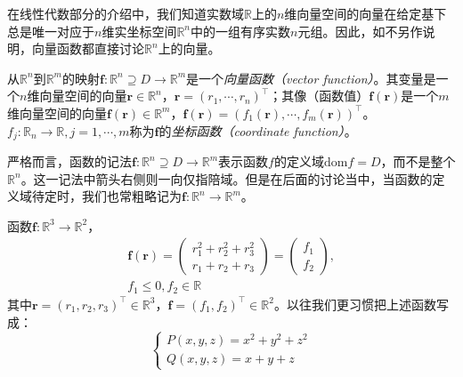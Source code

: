 \documentclass[main.tex]{subfiles}
\begin{document}
在线性代数部分的介绍中，我们知道实数域$\mathbb{R}$上的$n$维向量空间的向量在给定基下总是唯一对应于$n$维实坐标空间$\mathbb{R}^n$中的一组有序实数$n$元组。因此，如不另作说明，向量函数都直接讨论$\mathbb{R}^n$上的向量。

\begin{definition}[向量函数]\label{def:II.4.1}
    从$\mathbb{R}^n$到$\mathbb{R}^m$的映射$\mathbf{f}:\mathbb{R}^n\supseteq D\rightarrow\mathbb{R}^m$是一个\emph{向量函数（vector function）}。其变量是一个$n$维向量空间的向量$\mathbf{r}\in\mathbb{R}^n$，$\mathbf{r}=\left(r_1,\cdots,r_n\right)^\intercal$；其像（函数值）$\mathbf{f}\left(\mathbf{r}\right)$是一个$m$维向量空间的向量$\mathbf{f}\left(\mathbf{r}\right)\in\mathbb{R}^m$，$\mathbf{f}\left(\mathbf{r}\right)=\left(f_1\left(\mathbf{r}\right),\cdots,f_m\left(\mathbf{r}\right)\right)^\intercal$。$f_j:\mathbb{R}_n\rightarrow\mathbb{R},j=1,\cdots,m$称为$\mathbf{f}$的\emph{坐标函数（coordinate function）}。
\end{definition}

严格而言，函数的记法$\mathbf{f}:\mathbb{R}^n\supseteq D\rightarrow\mathbb{R}^m$表示函数$f$的定义域$\mathrm{dom}f=D$，而不是整个$\mathbb{R}^n$。这一记法中箭头右侧则一向仅指陪域。但是在后面的讨论当中，当函数的定义域待定时，我们也常粗略记为$\mathbf{f}:\mathbb{R}^n\rightarrow\mathbb{R}^m$。

\begin{example}
    函数$\mathbf{f}:\mathbb{R}^3\rightarrow\mathbb{R}^2$，
    \[\begin{split}\mathbf{f}\left(\mathbf{r}\right)=\left(\begin{array}{c}r_1^2+r_2^2+r_3^2\\r_1+r_2+r_3\end{array}\right)=\left(\begin{array}{c}f_1\\f_2\end{array}\right),\\f_1\leq0,f_2\in\mathbb{R}\end{split}\]
    其中$\mathbf{r}=\left(r_1,r_2,r_3\right)^\intercal\in\mathbb{R}^3$，$\mathbf{f}=\left(f_1,f_2\right)^\intercal\in\mathbb{R}^2$。以往我们更习惯把上述函数写成：
    \[
        \left\{\begin{array}{l}
            P\left(x,y,z\right)=x^2+y^2+z^2 \\
            Q\left(x,y,z\right)=x+y+z
        \end{array}
        \right.
    \]
\end{example}
\end{document}
